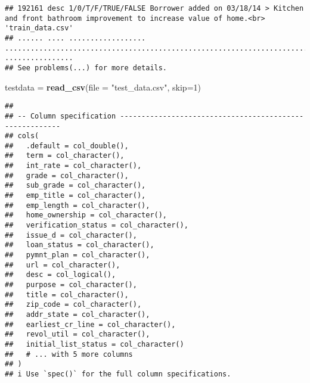 \documentclass[
]{article}
\newenvironment{Shaded}{\begin{snugshade}}{\end{snugshade}}
\newcommand{\DataTypeTok}[1]{\textcolor[rgb]{0.13,0.29,0.53}{#1}}
\newcommand{\DecValTok}[1]{\textcolor[rgb]{0.00,0.00,0.81}{#1}}
\newcommand{\KeywordTok}[1]{\textcolor[rgb]{0.13,0.29,0.53}{\textbf{#1}}}
\newcommand{\NormalTok}[1]{#1}
\newcommand{\StringTok}[1]{\textcolor[rgb]{0.31,0.60,0.02}{#1}}
\begin{document}
\begin{verbatim}
## 192161 desc 1/0/T/F/TRUE/FALSE Borrower added on 03/18/14 > Kitchen and front bathroom improvement to increase value of home.<br>                                                                                                                                                                                                                                                                                                                                                                                                                                                                                'train_data.csv'
## ...... .... .................. ................................................................................................................................................................................................................................................................................................................................................................................................................................................................................................................................................................................. ................
## See problems(...) for more details.
\end{verbatim}

\begin{Shaded}
\begin{Highlighting}[]
\NormalTok{testdata =}\StringTok{ }\KeywordTok{read_csv}\NormalTok{(}\DataTypeTok{file =} \StringTok{"test_data.csv"}\NormalTok{, }\DataTypeTok{skip=}\DecValTok{1}\NormalTok{)}
\end{Highlighting}
\end{Shaded}

\begin{verbatim}
## 
## -- Column specification --------------------------------------------------------
## cols(
##   .default = col_double(),
##   term = col_character(),
##   int_rate = col_character(),
##   grade = col_character(),
##   sub_grade = col_character(),
##   emp_title = col_character(),
##   emp_length = col_character(),
##   home_ownership = col_character(),
##   verification_status = col_character(),
##   issue_d = col_character(),
##   loan_status = col_character(),
##   pymnt_plan = col_character(),
##   url = col_character(),
##   desc = col_logical(),
##   purpose = col_character(),
##   title = col_character(),
##   zip_code = col_character(),
##   addr_state = col_character(),
##   earliest_cr_line = col_character(),
##   revol_util = col_character(),
##   initial_list_status = col_character()
##   # ... with 5 more columns
## )
## i Use `spec()` for the full column specifications.
\end{verbatim}
\end{document}
